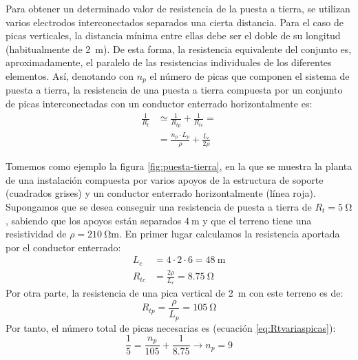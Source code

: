 Para obtener un determinado valor de resistencia de la puesta a
tierra, se utilizan varios electrodos interconectados separados una
cierta distancia. Para el caso de picas verticales, la distancia
mínima entre ellas debe ser el doble de su longitud (habitualmente de
\qty{2}{\meter}). De esta forma, la resistencia equivalente del
conjunto es, aproximadamente, el paralelo de las resistencias
individuales de los diferentes elementos. Así, denotando con $n_{p}$
el número de picas que componen el sistema de puesta a tierra, la
resistencia de una puesta a tierra compuesta por un conjunto de picas
interconectadas con un conductor enterrado horizontalmente es:
\begin{align}
  \frac{1}{R_{t}} &\simeq \frac{1}{R_{tp}} + \frac{1}{R_{tc}} = \\
                  &=\frac{n_{p}\cdot L_{p}}{\rho} + \frac{L_c}{2\rho}
\label{eq:Rtvariaspicas}
\end{align}

Tomemos como ejemplo la figura \ref{fig:puesta-tierra}, en la que se
muestra la planta de una instalación compuesta por varios apoyos de la
estructura de soporte (cuadrados grises) y un conductor enterrado
horizontalmente (línea roja).
Supongamos que se desea conseguir una resistencia de puesta a tierra
de $R_{t}=\qty{5}{\ohm}$, sabiendo que los apoyos están separados
$\qty{4}{\meter}$ y que el terreno tiene una resistividad de
$\rho=\qty{210}{\ohm\meter}$. En primer lugar calculamos la
resistencia aportada por el conductor enterrado:
\begin{align*}
  L_c &= 4 \cdot 2 \cdot 6 = \qty{48}{\meter}\\
  R_{tc} &= \frac{2\rho}{L_c} = \qty{8.75}{\ohm}
\end{align*}
Por otra parte, la resistencia de una pica vertical de \qty{2}{\meter} con este terreno es de:
\begin{equation*}
  R_{tp} = \frac{\rho}{L_p} = \qty{105}{\ohm}
\end{equation*}
Por tanto, el número total de picas necesarias es (ecuación \ref{eq:Rtvariaspicas}):
\begin{equation*}
  \frac{1}{5} =\frac{n_p}{105} + \frac{1}{8.75} \rightarrow n_p = 9
\end{equation*}

